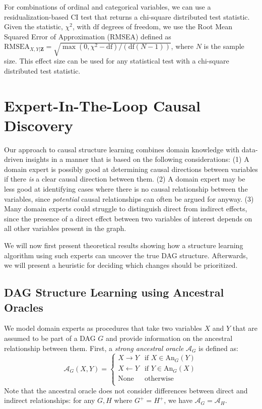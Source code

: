\documentclass[accepted]{uai2025} %
\begin{document}
For combinations of ordinal and categorical variables, we
can use a residualization-based CI test \citep{Ankan2023} that returns a 
chi-square distributed test statistic. Given the statistic, $ \chi^2 $, with $ \textrm{df} $ degrees of
freedom, we use the Root Mean Squared Error of Approximation (RMSEA) defined as
 $ \textrm{RMSEA}_{X, Y \rvert \bm{Z}} =
\sqrt{\max(0,\chi^2 - \textrm{df})/ (\textrm{df} (N-1))} $, where $ N $ is the sample
size. This effect size can be used for any statistical test with a chi-square 
distributed test statistic. 

\section{Expert-In-The-Loop Causal Discovery}


Our approach to causal structure learning combines domain knowledge with data-driven
insights in a manner that is based on the following considerations: 
(1) A domain expert is possibly good at determining causal directions between variables if 
there \emph{is} a clear causal direction between them. (2) A domain expert may be less good
at identifying cases where there is no causal relationship between the variables,
since \emph{potential} causal relationships can often be argued for anyway.
(3) Many domain experts could struggle to distinguish direct from indirect 
effects, since the presence of a direct effect between two variables
of interest depends on all other variables present in the graph. 

We will now first present theoretical results showing how a structure
learning algorithm using such experts can uncover the true DAG structure.
Afterwards, we will present a heuristic for deciding which changes should
be prioritized.

\subsection{DAG Structure Learning using Ancestral Oracles}

\label{sec:modification}

We model domain experts as procedures that take two variables $X$ and $Y$ that are assumed 
to be part of a DAG $G$ and 
provide information on the ancestral relationship between them. First, 
a \emph{strong ancestral oracle} $\mathcal{A}_G$ is defined as:
$$\mathcal{A}_G(X,Y)=\begin{cases}
 X \to Y & \textrm{if } X \in \textrm{An}_G(Y) \\
 X \gets Y & \textrm{if } Y \in \textrm{An}_G(X) \\
 \textrm{None} & \textrm{otherwise} \\
\end{cases}$$
Note that the ancestral oracle does not consider differences between direct and 
indirect relationships: for any $G, H$ where $G^+=H^+$, we have $\mathcal{A}_G=\mathcal{A}_H$.
\end{document}

